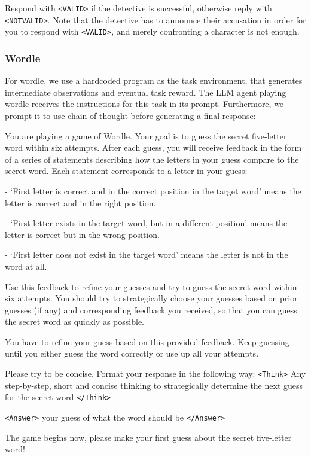 \begin{tcolorbox}[colback=gray!20, colframe=black, title=Murder Mystery Judge Prompt]
Respond with \texttt{<VALID>} if the detective is successful, otherwise reply with \texttt{<NOTVALID>}. Note that the detective has to announce their accusation in order for you to respond with \texttt{<VALID>}, and merely confronting a character is not enough.
\end{tcolorbox}

\newpage

\subsubsection{Wordle}

For wordle, we use a hardcoded program as the task environment, that generates intermediate observations and eventual task reward. The LLM agent playing wordle receives the instructions for this task in its prompt. Furthermore, we prompt it to use chain-of-thought before generating a final response:

\begin{tcolorbox}[colback=gray!20, colframe=black, title=Wordle Agent Prompt]
You are playing a game of Wordle. Your goal is to guess the secret five-letter word within six attempts. After each guess, you will receive feedback in the form of a series of statements describing how the letters in your guess compare to the secret word. Each statement corresponds to a letter in your guess: 

- `First letter is correct and in the correct position in the target word' means the letter is correct and in the right position. 

- `First letter exists in the target word, but in a different position' means the letter is correct but in the wrong position. 

- `First letter does not exist in the target word' means the letter is not in the word at all. 

Use this feedback to refine your guesses and try to guess the secret word within six attempts. You should try to strategically choose your guesses based on prior guesses (if any) and corresponding feedback you received, so that you can guess the secret word as quickly as possible. 

You have to refine your guess based on this provided feedback. Keep guessing until you either guess the word correctly or use up all your attempts.

Please try to be concise. Format your response in the following way: \texttt{<Think>} Any step-by-step, short and concise thinking to strategically determine the next guess for the secret word \texttt{</Think>} 

\texttt{<Answer>} your guess of what the word should be \texttt{</Answer>} 

The game begins now, please make your first guess about the secret five-letter word!

\end{tcolorbox}

